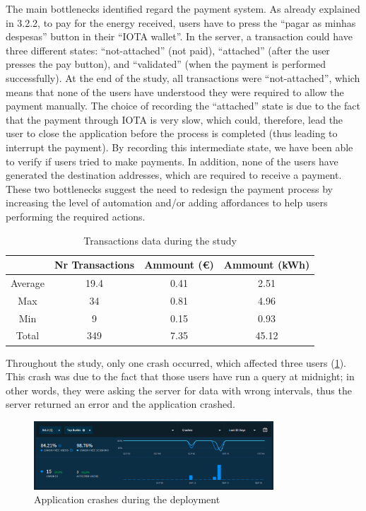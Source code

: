 The main bottlenecks identified regard the payment system. As already explained in 3.2.2, to pay for the energy received, users have to press the “pagar as minhas despesas” button in their “IOTA wallet”. In the server, a transaction could have three different states: “not-attached” (not paid), “attached” (after the user presses the pay button), and “validated” (when the payment is performed successfully). At the end of the study, all transactions were “not-attached”, which means that none of the users have understood they were required to allow the payment manually. The choice of recording the “attached” state is due to the fact that the payment through IOTA is very slow, which could, therefore, lead the user to close the application before the process is completed (thus leading to interrupt the payment). By recording this intermediate state, we have been able to verify if users tried to make payments. In addition, none of the users have generated the destination addresses, which are required to receive a payment. These two bottlenecks suggest the need to redesign the payment process by increasing the level of automation and/or adding affordances to help users performing the required actions.

\begin{table}[htb]
\centering
\normalsize
    \caption{Transactions data during the study}
    \label{tab:tr}
{\footnotesize
    \begin{tabular}{ | c | c | c | c | }
    \hline 
    	& \textbf{Nr Transactions} & \textbf{Ammount (\euro)} & \textbf{Ammount (kWh)}\\ \hline \hline
    Average  & 19.4  &  0.41  &   2.51 \\ \hline
    Max  & 34   &  0.81  &   4.96 \\ \hline 
    Min  & 9   &  0.15  &   0.93 \\ \hline
    Total  & 349  &  7.35  & 45.12 \\ \hline
    \end{tabular}
    }
\end{table}

Throughout the study, only one crash occurred, which affected three users (\cref{fig:crash}). This crash was due to the fact that those users have run a query at midnight; in other words, they were asking the server for data with wrong intervals, thus the server returned an error and the application crashed.

 \begin{figure}[h]
\centering
\includegraphics[width=0.8\textwidth]{./Images/crash}
\caption{Application crashes during the deployment}
\label{fig:crash}
\end{figure}